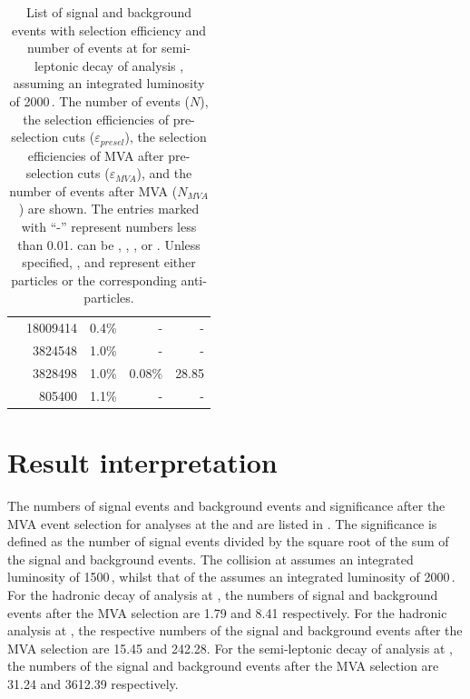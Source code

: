 \begin{table}[!htbp]
\begin{tabular}{lrrrr}
\hline
\gammagamma{\Pphoton}{\BS}{\Pphoton}{\BS}{ \Pquark \Pquark \Pquark \Pquark}& 18009414  & 0.4\%&   - & - \\
\gammagamma{\Pphoton}{\BS}{\Pphoton}{\EPA}{ \Pquark \Pquark \Pquark \Pquark}& 3824548 & 1.0\%&  - & - \\
\gammagamma{\Pphoton}{\EPA}{\Pphoton}{\BS}{ \Pquark \Pquark \Pquark \Pquark}& 3828498 & 1.0\%&  0.08\% & 28.85 \\
\gammagamma{\Pphoton}{\EPA}{\Pphoton}{\EPA}{ \Pquark \Pquark \Pquark \Pquark}& 805400& 1.1\%&  - & - \\
\hline \hline
\end{tabular}
\caption
{List of signal and background events with selection efficiency and number of events at   for semi-leptonic \WW decay of \eeToHHbbWW analysis , assuming an integrated luminosity of 2000\,. The number of events ($N$), the selection efficiencies of pre-selection cuts ($\varepsilon_{presel}$), the selection efficiencies of MVA after pre-selection cuts ($\varepsilon_{MVA}$), and the number of events after MVA ($N_{MVA}$) are shown. The entries marked with ``-'' represent  numbers less than 0.01. \Pquark can be \Pup, \Pdown, \Pstrange, \Pbottom or \Ptop. Unless specified, \Pquark, \Plepton and \Pnu represent either particles or the corresponding anti-particles.}
\label{tab:doubleHiggsQlv3TeVMVA}
\end{table}
\section{Result interpretation}
\label{sec:doubleHiggsResults}



The numbers of signal events and background events and significance after the MVA event selection for analyses at the  and   are listed in . The significance is defined as the number of signal events divided by the square root of the sum of  the signal and background events. The \ee collision at  assumes an integrated luminosity of 1500\,, whilst that of the  assumes an integrated luminosity of 2000\,.  For the hadronic \WW decay of \eeToHHbbWW analysis at , the numbers of signal and background events after the MVA selection are 1.79 and 8.41 respectively. For the hadronic analysis at , the respective numbers of the signal and background events after the MVA selection are 15.45 and 242.28. For the semi-leptonic \WW decay of \eeToHHbbWW analysis at , the numbers of the signal and background events after the MVA selection are 31.24 and 3612.39 respectively.

